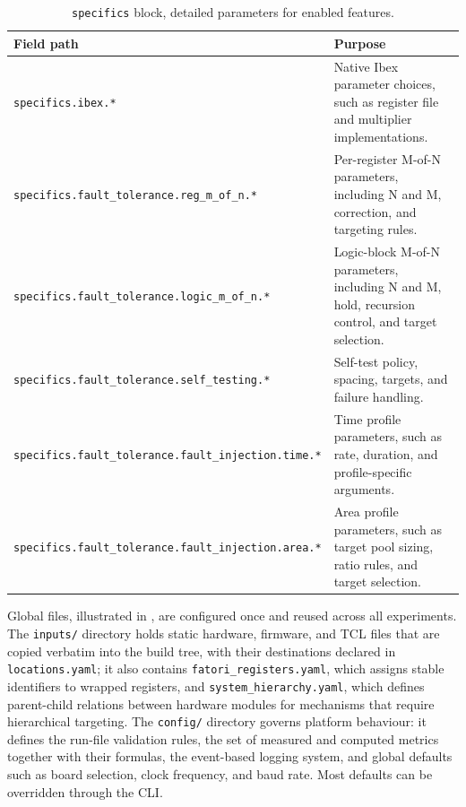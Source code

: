 \begin{table}[h]
\centering
\small
\setlength{\tabcolsep}{3.2pt}
\renewcommand{\arraystretch}{1.25}
\begin{tabularx}{\textwidth}{|>{\raggedright\arraybackslash}p{}|X|}
\hline
\rowcolor{tableheader}\textbf{Field path} &
\textbf{Purpose} \\
\hline
\hline
\texttt{specifics.ibex.*} &
Native Ibex parameter choices, such as register file and multiplier implementations. \\
\hline
\texttt{specifics.fault\_tolerance.reg\_m\_of\_n.*} &
Per-register M-of-N parameters, including N and M, correction, and targeting rules. \\
\hline
\texttt{specifics.fault\_tolerance.logic\_m\_of\_n.*} &
Logic-block M-of-N parameters, including N and M, hold, recursion control, and target selection. \\
\hline
\texttt{specifics.fault\_tolerance.self\_testing.*} &
Self-test policy, spacing, targets, and failure handling. \\
\hline
\texttt{specifics.fault\_tolerance.fault\_injection.time.*} &
Time profile parameters, such as rate, duration, and profile-specific arguments. \\
\hline
\texttt{specifics.fault\_tolerance.fault\_injection.area.*} &
Area profile parameters, such as target pool sizing, ratio rules, and target selection. \\
\hline
\end{tabularx}
\caption{\texttt{specifics} block, detailed parameters for enabled features.}
\label{tab:yaml_specifics_fields}
\end{table}


\label{chap3:ui_config}Global files, illustrated in , are configured once and reused across all experiments. The \texttt{inputs/} directory holds static hardware, firmware, and \ac{TCL} files that are copied verbatim into the build tree, with their destinations declared in \texttt{locations.yaml}; it also contains \texttt{fatori\_registers.yaml}, which assigns stable identifiers to wrapped registers, and \texttt{system\_hierarchy.yaml}, which defines parent-child relations between hardware modules for mechanisms that require hierarchical targeting. The \texttt{config/} directory governs platform behaviour: it defines the run-file validation rules, the set of measured and computed metrics together with their formulas, the event-based logging system, and global defaults such as board selection, clock frequency, and baud rate. Most defaults can be overridden through the \ac{CLI}.


